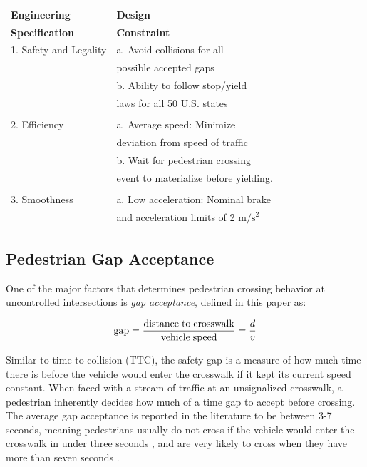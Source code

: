 \documentclass[letterpaper, 10 pt, conference]{ieeeconf}  %
\begin{document}
\begin{center}
\begin{tabular}{ l| l }
\label{tb:specs}
 \textbf{Engineering} & \textbf{Design} \\
 \textbf{Specification\cite{Thornton2018}} & \textbf{Constraint}\\\hline 
 1. Safety and Legality & a. Avoid collisions for all\\
                     & possible accepted gaps                        \\
                     &b. Ability to follow stop/yield    \\
                     &laws for all 50 U.S. states\\
                     
&\\
 2. Efficiency & a. Average speed: Minimize  \\ 
               & deviation from speed of traffic \\    
               & b. Wait for pedestrian crossing \\
               & event to materialize before yielding. \\ 

               & \\
 3. Smoothness & a. Low acceleration: Nominal brake \\ 
 			   & and acceleration limits of 2 $\mathrm{m/s^2}$ \\


\end{tabular}
\end{center}

\subsection{Pedestrian Gap Acceptance}

One of the major factors that determines pedestrian crossing behavior at uncontrolled intersections is \textit{gap acceptance}, defined in this paper as:

\begin{equation}
\mathrm{gap} = \frac{\mathrm{distance\hspace{1mm}to\hspace{1mm}crosswalk}}{\mathrm{vehicle\hspace{1mm}speed}} = \frac{d}{v}
\end{equation} 

Similar to time to collision (TTC), the safety gap is a measure of how much time there is before the vehicle would enter the crosswalk if it kept its current speed constant. When faced with a stream of traffic at an unsignalized crosswalk, a pedestrian inherently decides how much of a time gap to accept before crossing. The average gap acceptance is reported in the literature to be between 3-7 seconds, meaning pedestrians usually do not cross if the vehicle would enter the crosswalk in under three seconds \cite{DiPietroCharlesMandKing1970}, and are very likely to cross when they have more than seven seconds \cite{Schmidt2009}. 
\end{document}
